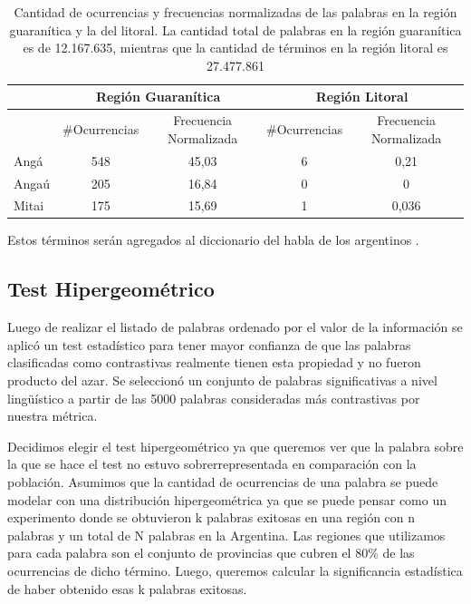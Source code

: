 \begin{table}
\centering

\begin{tabular}{|l|cc|cc|}
\hline
 & \multicolumn{2}{c}{Región Guaranítica} & \multicolumn{2}{c}{Región Litoral} \\ \hline
      & \#Ocurrencias & Frecuencia Normalizada & \#Ocurrencias & Frecuencia Normalizada \\
Angá  & 548              & 45,03       & 6             & 0,21                  \\
Angaú & 205               & 16,84   & 0               & 0                     \\
Mitai & 175              & 15,69      & 1              & 0,036    \\ \hline              
\end{tabular}

\caption{Cantidad de ocurrencias y frecuencias normalizadas de las palabras en la región guaranítica y la del litoral. La cantidad total de palabras en la región guaranítica es de 12.167.635, mientras que la cantidad de términos en la región litoral es 27.477.861 }
\label{tab:guaranismos}
\end{table}

Estos términos serán agregados al diccionario del habla de los argentinos \cite{academia2008diccionario}.



\subsection{Test Hipergeométrico}
Luego de realizar el listado de palabras ordenado por el valor de la información se aplicó un test estadístico para tener mayor confianza de que las palabras clasificadas como contrastivas realmente tienen esta propiedad y no fueron producto del azar. Se seleccionó un conjunto de palabras significativas a nivel lingüístico a partir de las 5000 palabras consideradas más contrastivas por nuestra métrica. 

Decidimos elegir el test hipergeométrico ya que queremos ver que la palabra sobre la que se hace el test no estuvo sobrerrepresentada en comparación con la población. Asumimos que la cantidad de ocurrencias de una palabra se puede modelar con una distribución hipergeométrica ya que se puede pensar como un experimento donde se obtuvieron k palabras exitosas en una región con n palabras y un total de N palabras en la Argentina. Las regiones que utilizamos para cada palabra son el conjunto de provincias que cubren el 80\% de las ocurrencias de dicho término. Luego, queremos calcular la significancia estadística de haber obtenido esas k palabras exitosas.

